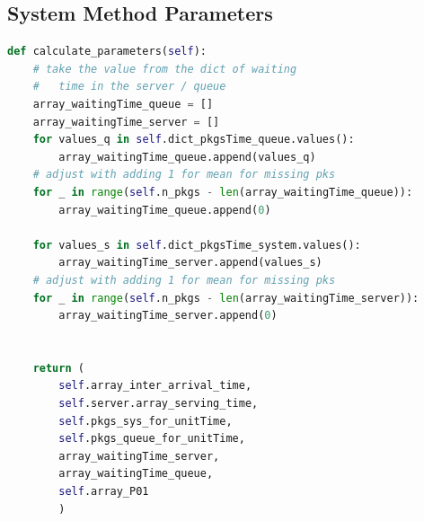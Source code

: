 \documentclass[12pt,a4paper]{article}
\begin{document}
\subsection{System Method Parameters}
\begin{lstlisting}[language=Python, caption=System Method Parameters]
def calculate_parameters(self):
    # take the value from the dict of waiting 
    # 	time in the server / queue
    array_waitingTime_queue = []
    array_waitingTime_server = []
    for values_q in self.dict_pkgsTime_queue.values():
        array_waitingTime_queue.append(values_q)
    # adjust with adding 1 for mean for missing pks 
    for _ in range(self.n_pkgs - len(array_waitingTime_queue)):
        array_waitingTime_queue.append(0)

    for values_s in self.dict_pkgsTime_system.values():
        array_waitingTime_server.append(values_s)
    # adjust with adding 1 for mean for missing pks 
    for _ in range(self.n_pkgs - len(array_waitingTime_server)):
        array_waitingTime_server.append(0)


    return (
        self.array_inter_arrival_time,
        self.server.array_serving_time,
        self.pkgs_sys_for_unitTime,  
        self.pkgs_queue_for_unitTime,
        array_waitingTime_server,
        array_waitingTime_queue,
        self.array_P01
        )
\end{lstlisting}

\newpage
\end{document}
